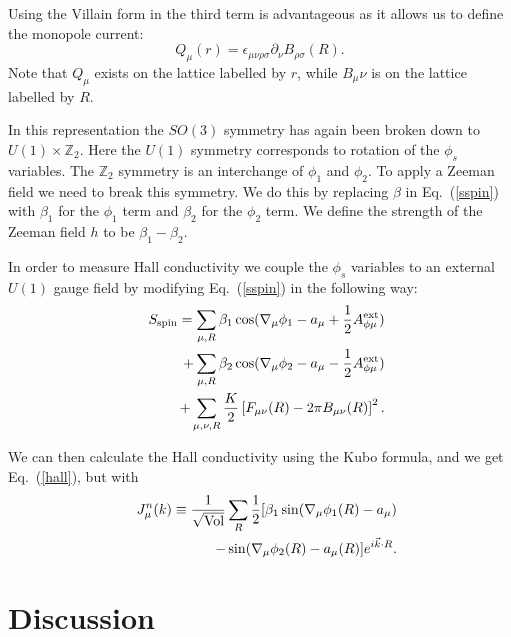 \documentclass[prb,twocolumn]{revtex4}
\begin{document}
Using the Villain form in the third term is advantageous as it allows us to define the monopole current:
\begin{equation}
Q_\mu(r)=\epsilon_{\mu\nu\rho\sigma}\partial_\nu B_{\rho\sigma}(R).
\end{equation}
Note that $Q_\mu$ exists on the lattice labelled by $r$, while $B_\mu\nu$ is on the lattice labelled by $R$.

In this representation the $SO(3)$ symmetry has again been broken down to $U(1)\times \mathbb{Z}_2$. Here the $U(1)$ symmetry corresponds to rotation of the $\phi_s$ variables. The $\mathbb{Z}_2$ symmetry is an interchange of $\phi_1$ and $\phi_2$. To apply a Zeeman field we need to break this symmetry. We do this by replacing $\beta$ in Eq.~(\ref{sspin}) with $\beta_1$ for the $\phi_1$ term and $\beta_2$ for the $\phi_2$ term. We define the strength of the Zeeman field $h$ to be $\beta_1-\beta_2$. 

In order to measure Hall conductivity we couple the $\phi_s$ variables to an external $U(1)$ gauge field by modifying Eq.~(\ref{sspin}) in the following way:
\begin{eqnarray}
&&S_{{\rm spin}}=\sum_{\mu,R}\beta_1\cos(\nabla_\mu\phi_1-a_\mu+\frac{1}{2}A^{\rm ext}_{\phi\mu}) \\
&&+ \sum_{\mu,R}\beta_2\cos(\nabla_\mu\phi_2-a_\mu-\frac{1}{2}A^{\rm ext}_{\phi\mu}) \nonumber\\
&&+\sum_{\mu,\nu,R}\frac{K}{2}\left[F_{\mu\nu}(R)-2\pi B_{\mu\nu}(R)\right]^2.
\end{eqnarray}

We can then calculate the Hall conductivity using the Kubo formula, and we get Eq.~(\ref{hall}), but with
\begin{eqnarray}
&&J^n_\mu(k)\equiv \frac{1}{\rm \sqrt{Vol}}\sum_R \frac{1}{2}[\beta_1\sin(\nabla_\mu\phi_1(R)-a_\mu) \\
&&-\sin(\nabla_\mu\phi_2(R)-a_\mu(R)] e^{i\vec{k}\cdot R}.\nonumber
\end{eqnarray}

\section{Discussion}
\end{document}
